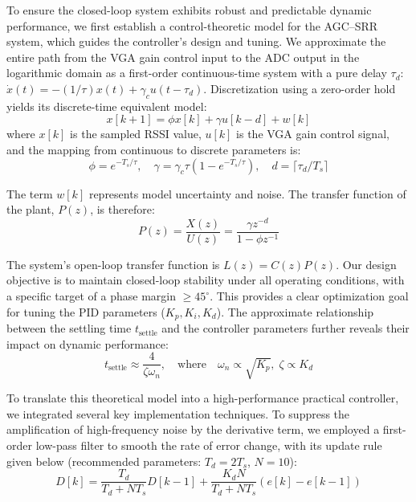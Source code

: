 \documentclass[journal]{IEEEtran}
\begin{document}
To ensure the closed-loop system exhibits robust and predictable dynamic performance, we first establish a control-theoretic model for the AGC–SRR system, which guides the controller's design and tuning. We approximate the entire path from the VGA gain control input to the ADC output in the logarithmic domain as a first-order continuous-time system with a pure delay $\tau_d$: $\dot{x}(t) = -(1/\tau)x(t) + \gamma_c u(t-\tau_d)$. Discretization using a zero-order hold yields its discrete-time equivalent model:
\begin{equation}
    x[k+1] = \phi x[k] + \gamma u[k-d] + w[k]
\end{equation}
where $x[k]$ is the sampled RSSI value, $u[k]$ is the VGA gain control signal, and the mapping from continuous to discrete parameters is:
\begin{equation}
    \phi = e^{-T_s/\tau}, \quad \gamma = \gamma_c \tau (1 - e^{-T_s/\tau}), \quad d = \lceil \tau_d / T_s \rceil
\end{equation}

The term $w[k]$ represents model uncertainty and noise. The transfer function of the plant, $P(z)$, is therefore:
\begin{equation}
    P(z) = \frac{X(z)}{U(z)} = \frac{\gamma z^{-d}}{1 - \phi z^{-1}}
\end{equation}

The system's open-loop transfer function is $L(z)=C(z)P(z)$. Our design objective is to maintain closed-loop stability under all operating conditions, with a specific target of a phase margin $\ge 45^{\circ}$. This provides a clear optimization goal for tuning the PID parameters ($K_p, K_i, K_d$). The approximate relationship between the settling time $t_{\text{settle}}$ and the controller parameters further reveals their impact on dynamic performance:
\begin{equation}
t_{\mathrm{settle}}\approx \frac{4}{\zeta\omega_n}, \quad \text{where} \quad
\omega_n \propto \sqrt{K_p}, \; \zeta \propto K_d
\end{equation}

To translate this theoretical model into a high-performance practical controller, we integrated several key implementation techniques. To suppress the amplification of high-frequency noise by the derivative term, we employed a first-order low-pass filter to smooth the rate of error change, with its update rule given below (recommended parameters: $T_d=2T_s$, $N=10$):
\begin{equation}
    D[k]=\frac{T_d}{T_d+N T_s}D[k-1]+\frac{K_d N}{T_d+N T_s}(e[k]-e[k-1])
\end{equation}
\end{document}
